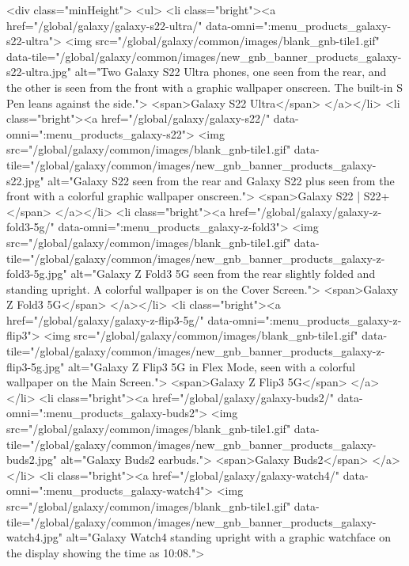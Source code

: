 					<div class="minHeight">
						<ul>
							<li class="bright"><a href="/global/galaxy/galaxy-s22-ultra/" data-omni=":menu_products_galaxy-s22-ultra">
								<img src="/global/galaxy/common/images/blank_gnb-tile1.gif"
									data-tile="/global/galaxy/common/images/new_gnb_banner_products_galaxy-s22-ultra.jpg"
									alt="Two Galaxy S22 Ultra phones, one seen from the rear, and the other is seen from the front with a graphic wallpaper onscreen. The built-in S Pen leans against the side.">
								<span>Galaxy S22 Ultra</span>
							</a></li>
							<li class="bright"><a href="/global/galaxy/galaxy-s22/" data-omni=":menu_products_galaxy-s22">
								<img src="/global/galaxy/common/images/blank_gnb-tile1.gif"
									data-tile="/global/galaxy/common/images/new_gnb_banner_products_galaxy-s22.jpg"
									alt="Galaxy S22 seen from the rear and Galaxy S22 plus seen from the front with a colorful graphic wallpaper onscreen.">
								<span>Galaxy S22 | S22+ </span>
							</a></li>
							<li class="bright"><a href="/global/galaxy/galaxy-z-fold3-5g/" data-omni=":menu_products_galaxy-z-fold3">
								<img src="/global/galaxy/common/images/blank_gnb-tile1.gif"
									data-tile="/global/galaxy/common/images/new_gnb_banner_products_galaxy-z-fold3-5g.jpg"
									alt="Galaxy Z Fold3 5G seen from the rear slightly folded and standing upright. A colorful wallpaper is on the Cover Screen.">
								<span>Galaxy Z Fold3 5G</span>
							</a></li>
							<li class="bright"><a href="/global/galaxy/galaxy-z-flip3-5g/" data-omni=":menu_products_galaxy-z-flip3">
								<img src="/global/galaxy/common/images/blank_gnb-tile1.gif"
									data-tile="/global/galaxy/common/images/new_gnb_banner_products_galaxy-z-flip3-5g.jpg"
									alt="Galaxy Z Flip3 5G in Flex Mode, seen with a colorful wallpaper on the Main Screen.">
								<span>Galaxy Z Flip3 5G</span>
							</a></li>
							<li class="bright"><a href="/global/galaxy/galaxy-buds2/" data-omni=":menu_products_galaxy-buds2">
								<img src="/global/galaxy/common/images/blank_gnb-tile1.gif"
									data-tile="/global/galaxy/common/images/new_gnb_banner_products_galaxy-buds2.jpg"
									alt="Galaxy Buds2 earbuds.">
								<span>Galaxy Buds2</span>
							</a></li>
							<li class="bright"><a href="/global/galaxy/galaxy-watch4/" data-omni=":menu_products_galaxy-watch4">
								<img src="/global/galaxy/common/images/blank_gnb-tile1.gif"
									data-tile="/global/galaxy/common/images/new_gnb_banner_products_galaxy-watch4.jpg"
									alt="Galaxy Watch4 standing upright with a graphic watchface on the display showing the time as 10:08.">
